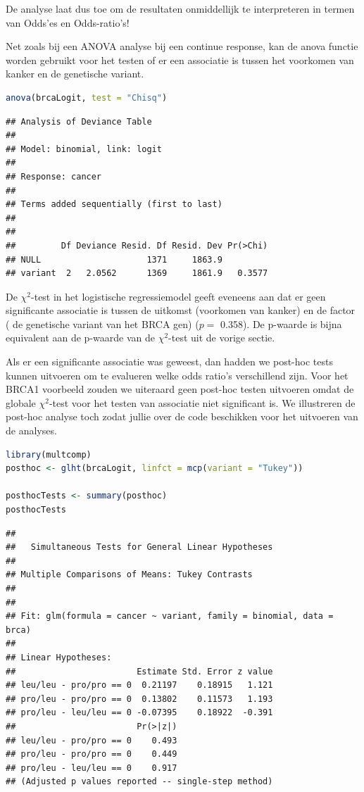 \documentclass[
  12pt,dutch,coursenotes]{book}
\begin{document}
De analyse laat dus toe om de resultaten onmiddellijk te interpreteren in termen van Odds'es en Odds-ratio's!

Net zoals bij een ANOVA analyse bij een continue response, kan de anova functie worden gebruikt voor het testen of er een associatie is tussen het voorkomen van kanker en de genetische variant.

\begin{lstlisting}[language=R]
anova(brcaLogit, test = "Chisq")
\end{lstlisting}

\begin{lstlisting}
## Analysis of Deviance Table
## 
## Model: binomial, link: logit
## 
## Response: cancer
## 
## Terms added sequentially (first to last)
## 
## 
##         Df Deviance Resid. Df Resid. Dev Pr(>Chi)
## NULL                     1371     1863.9         
## variant  2   2.0562      1369     1861.9   0.3577
\end{lstlisting}

De \(\chi^2\)-test in het logistische regressiemodel geeft eveneens aan dat er geen significante associatie is tussen de uitkomst (voorkomen van kanker) en de factor ( de genetische variant van het BRCA gen) (\(p=\) 0.358).
De p-waarde is bijna equivalent aan de p-waarde van de \(\chi^2\)-test uit de vorige sectie.

Als er een significante associatie was geweest, dan hadden we post-hoc tests kunnen uitvoeren om te evalueren welke odds ratio's verschillend zijn.
Voor het BRCA1 voorbeeld zouden we uiteraard geen post-hoc testen uitvoeren omdat de globale \(\chi^2\)-test voor het testen van associatie niet significant is.
We illustreren de post-hoc analyse toch zodat jullie over de code beschikken voor het uitvoeren van de analyses.

\begin{lstlisting}[language=R]
library(multcomp)
posthoc <- glht(brcaLogit, linfct = mcp(variant = "Tukey"))

posthocTests <- summary(posthoc)
posthocTests
\end{lstlisting}

\begin{lstlisting}
## 
##   Simultaneous Tests for General Linear Hypotheses
## 
## Multiple Comparisons of Means: Tukey Contrasts
## 
## 
## Fit: glm(formula = cancer ~ variant, family = binomial, data = brca)
## 
## Linear Hypotheses:
##                        Estimate Std. Error z value
## leu/leu - pro/pro == 0  0.21197    0.18915   1.121
## pro/leu - pro/pro == 0  0.13802    0.11573   1.193
## pro/leu - leu/leu == 0 -0.07395    0.18922  -0.391
##                        Pr(>|z|)
## leu/leu - pro/pro == 0    0.493
## pro/leu - pro/pro == 0    0.449
## pro/leu - leu/leu == 0    0.917
## (Adjusted p values reported -- single-step method)
\end{lstlisting}
\end{document}
